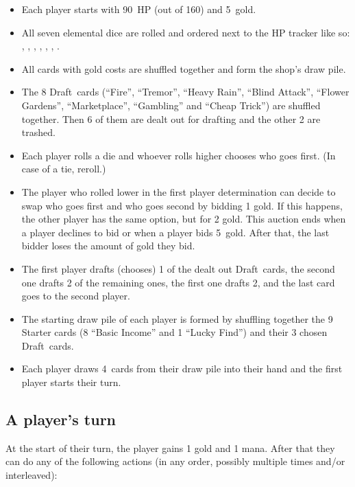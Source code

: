 \documentclass[dvipsnames,parskip,a4paper]{scrartcl}
\newcommand{\iconsize}{3.4mm}
\newcommand{\icondepth}{0.45mm}
\newcommand{\icon}[1]{\raisebox{-\icondepth}{\texttt{[image:  \#1 ]}}}
\newcommand{\chance}{\icon{icons/chance.png}}
\newcommand{\fire}{\icon{icons/fire.png}}
\newcommand{\earth}{\icon{icons/earth.png}}
\newcommand{\water}{\icon{icons/water.png}}
\newcommand{\nature}{\icon{icons/nature.png}}
\newcommand{\magic}{\icon{icons/magic.png}}
\newcommand{\gold}{\icon{icons/gold.png}}
\newcommand{\draft}{Draft}
\newcommand{\startgold}{5}
\newcommand{\handsize}{4}
\newcommand{\starthp}{90}
\newcommand{\maxhp}{160}
\begin{document}
\begin{itemize}
\item Each player starts with \starthp \ HP (out of \maxhp) and \startgold \ gold.
\item All seven elemental dice are rolled and ordered next to the HP tracker like so: \chance, \fire, \earth, \water, \nature, \gold, \magic.
\item All cards with gold costs are shuffled together and form the shop's draw pile.
\item The 8 \draft \ cards (``Fire'', ``Tremor'', ``Heavy Rain'', ``Blind Attack'', ``Flower Gardens'', ``Marketplace'', ``Gambling'' and ``Cheap Trick'') are shuffled together. Then 6 of them are dealt out for drafting and the other 2 are trashed.
\item Each player rolls a die and whoever rolls higher chooses who goes first. (In case of a tie, reroll.)
\item The player who rolled lower in the first player determination can decide to swap who goes first and who goes second by bidding 1 gold. If this happens, the other player has the same option, but for 2 gold. This auction ends when a player declines to bid or when a player bids \startgold \ gold. After that, the last bidder loses the amount of gold they bid.
\item The first player drafts (chooses) 1 of the dealt out \draft \ cards, the second one drafts 2 of the remaining ones, the first one drafts 2, and the last card goes to the second player.
\item The starting draw pile of each player is formed by shuffling together the 9 Starter cards (8 ``Basic Income'' and 1 ``Lucky Find'') and their 3 chosen \draft \ cards.
\item Each player draws \handsize \ cards from their draw pile into their hand and the first player starts their turn.
\end{itemize}

\subsection*{A player's turn}

At the start of their turn, the player gains 1 gold and 1 mana. After that they can do any of the following actions (in any order, possibly multiple times and/or interleaved):
\end{document}
